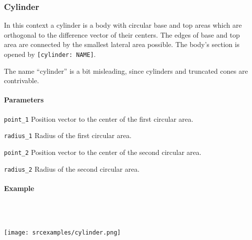 \subsubsection{Cylinder}
In this context a cylinder is a body with circular base and top areas which are orthogonal to the difference vector of their centers. The edges of base and top area are connected by the smallest lateral area possible. The body's section is opened by \lstinline{[cylinder: NAME]}.

The name ``cylinder'' is a bit misleading, since cylinders and truncated cones are contrivable.

\paragraph{Parameters}
\begin{description}
 \item{\lstinline{point_1}} Position vector to the center of the first circular area.
 \item{\lstinline{radius_1}} Radius of the first circular area.
 \item{\lstinline{point_2}} Position vector to the center of the second circular area.
 \item{\lstinline{radius_2}} Radius of the second circular area.
\end{description}

\paragraph{Example}\ 


\ \\\texttt{[image: srcexamples/cylinder.png]}